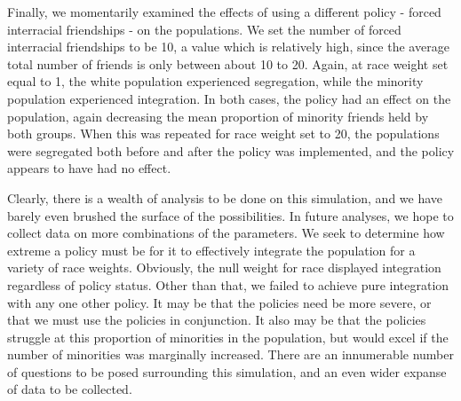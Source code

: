 
Finally, we momentarily examined the effects of using a different policy - forced interracial friendships - on the 
populations. We set the number of forced interracial friendships to be 10, a value which is relatively high, since the average 
total number of friends is only between about 10 to 20. Again, at race weight set equal to 1, the white population 
experienced segregation, while the minority population experienced integration. In both cases, the policy had an effect on the 
population, again decreasing the mean proportion of minority friends held by both groups. When this was repeated for race 
weight set to 20, the populations were segregated both before and after the policy was implemented, and the policy appears 
to have had no effect.

Clearly, there is a wealth of analysis to be done on this simulation, and we have barely even brushed the surface of the 
possibilities. In future analyses, we hope to collect data on more combinations of the parameters. We seek to determine how 
extreme a policy must be for it to effectively integrate the population for a variety of race weights. Obviously, the null 
weight for race displayed integration regardless of policy status. Other than that, we failed to achieve pure integration 
with any one other policy. It may be that the policies need be more severe, or that we must use the policies in 
conjunction. It also may be that the policies struggle at this proportion of minorities in the population, but would 
excel if the number of minorities was marginally increased. There are an innumerable number of questions to be posed 
surrounding this simulation, and an even wider expanse of data to be collected.
